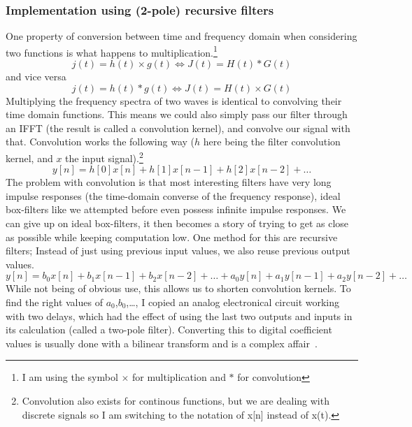 \documentclass[11pt,a4paper]{article}
\begin{document}
\subsubsection{Implementation using (2-pole) recursive filters}

One property of conversion between time and frequency domain when considering two functions is what happens to multiplication.\footnote{I am using the symbol $\times$ for multiplication and $*$ for convolution}
\begin{equation}
j(t) = h(t) \times g(t) \iff J(t) = H(t) * G(t)
\end{equation}
and vice versa
\begin{equation}
j(t) = h(t) * g(t) \iff J(t) = H(t) \times G(t)
\end{equation}
Multiplying the frequency spectra of two waves is identical to convolving their time domain functions.
This means we could also simply pass our filter through an IFFT (the result is called a convolution kernel), and convolve our signal with that.
Convolution works the following way ($h$ here being the filter convolution kernel, and $x$ the input signal).\footnote{Convolution also exists for continous functions, but we are dealing with discrete signals so I am switching to the notation of x[n] instead of x(t).}
\begin{equation}
y[n] = h[0]x[n] + h[1]x[n-1] + h[2]x[n-2] + \dots
\end{equation}
The problem with convolution is that most interesting filters have very long impulse responses (the time-domain converse of the frequency response), ideal box-filters like we attempted before even possess infinite impulse responses.
We can give up on ideal box-filters, it then becomes a story of trying to get as close as possible while keeping computation low. One method for this are recursive filters; Instead of just using previous input values, we also reuse previous output values.
\begin{equation}
y[n] = b_0x[n] + b_1x[n-1] + b_2x[n-2] + \dots + a_0y[n] + a_1y[n-1] + a_2y[n-2] + \dots
\end{equation}
While not being of obvious use, this allows us to shorten convolution kernels. To find the right values of $a_0$,$b_0$,\dots, I copied an analog electronical circuit working with two delays, which had the effect of using the last two outputs and inputs in its calculation (called a two-pole filter). Converting this to digital coefficient values is usually done with a bilinear transform and is a complex affair~\cite[chap. 3.5]{ZoranDFD}.
\end{document}
